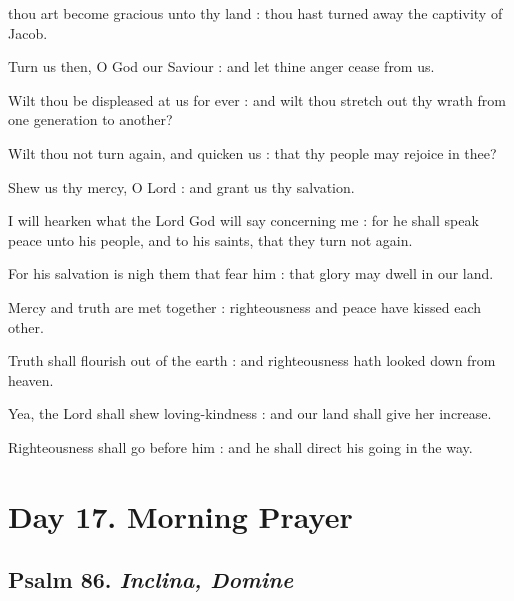  thou art become gracious unto thy land : thou hast turned away the captivity of Jacob.\par
{}
Turn us then, O God our Saviour : and let thine anger cease from us.\par
{}Wilt thou be displeased at us for ever : and wilt thou stretch out thy wrath from one generation to another?\par
{}Wilt thou not turn again, and quicken us : that thy people may rejoice in thee?\par
{}Shew us thy mercy, O Lord : and grant us thy salvation.\par
{}I will hearken what the Lord God will say concerning me : for he shall speak peace unto his people, and to his saints, that they turn not again.\par
{}For his salvation is nigh them that fear him : that glory may dwell in our land.\par
{}Mercy and truth are met together : righteousness and peace have kissed each other.\par
{}Truth shall flourish out of the earth : and righteousness hath looked down from heaven.\par
{}Yea, the Lord shall shew loving-kindness : and our land shall give her increase.\par
{}Righteousness shall go before him : and he shall direct his going in the way.\par

\section*{Day 17. Morning Prayer}

\subsection{Psalm 86. \textit{Inclina, Domine}}

